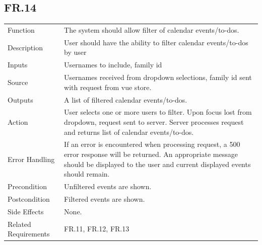 \documentclass[12pt]{article}
\begin{document}
    \subsection*{FR.14}
    \begin{center}
        \begin{tabular}{| p{10em} p{26em} |}
        \hline
         Function & The system should allow filter of calendar events/to-dos.\\
         Description & User should have the ability to filter calendar events/to-dos by user\\
         Inputs & Usernames to include, family id\\
         Source & Usernames received from dropdown selections, family id sent with request from vue store.\\
         Outputs & A list of filtered calendar events/to-dos.\\
         Action & User selects one or more users to filter. Upon focus lost from dropdown, request sent to server. Server processes request and returns list of calendar events/to-dos.\\
         Error Handling & If an error is encountered when processing request, a 500 error response will be returned. An appropriate message should be displayed to the user and current displayed events should remain.\\
         Precondition & Unfiltered events are shown.\\
         Postcondition & Filtered events are shown.\\
         Side Effects & None.\\
         Related Requirements & FR.11, FR.12, FR.13\\
         \hline
        \end{tabular}
    \end{center}
\end{document}
